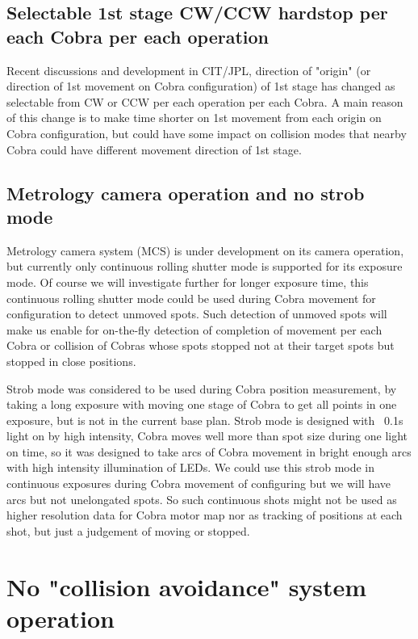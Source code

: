 \documentclass[a4paper,notitlepage]{article}
\begin{document}
\subsection{Selectable 1st stage CW/CCW hardstop per each Cobra per each operation}

Recent discussions and development in CIT/JPL, direction of "origin" (or 
direction of 1st movement on Cobra configuration) of 1st stage has changed 
as selectable from CW or CCW per each operation per each Cobra. A main reason 
of this change is to make time shorter on 1st movement from each origin on 
Cobra configuration, but could have some impact on collision modes that 
nearby Cobra could have different movement direction of 1st stage. 

\subsection{Metrology camera operation and no strob mode}

Metrology camera system (MCS) is under development on its camera operation, 
but currently only continuous rolling shutter mode is supported for its 
exposure mode. Of course we will investigate further for longer exposure 
time, this continuous rolling shutter mode could be used during Cobra 
movement for configuration to detect unmoved spots. Such detection of 
unmoved spots will make us enable for on-the-fly detection of completion 
of movement per each Cobra or collision of Cobras whose spots stopped not 
at their target spots but stopped in close positions. 

Strob mode was considered to be used during Cobra position measurement, by 
taking a long exposure with moving one stage of Cobra to get all points in 
one exposure, but is not in the current base plan. Strob mode is designed 
with ~0.1s light on by high intensity, Cobra moves well more than spot size 
during one light on time, so it was designed to take arcs of Cobra movement 
in bright enough arcs with high intensity illumination of LEDs. We could use 
this strob mode in continuous exposures during Cobra movement of configuring 
but we will have arcs but not unelongated spots. So such continuous shots 
might not be used as higher resolution data for Cobra motor map nor as 
tracking of positions at each shot, but just a judgement of moving or stopped.


\section{No "collision avoidance" system operation}
\end{document}
